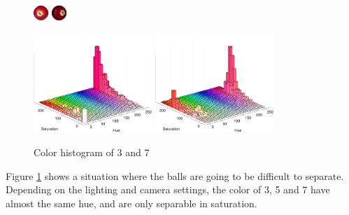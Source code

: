 \begin{figure}[H]
\centering
\subfloat
{
	\includegraphics[width=0.05\textwidth]{images/balls/3.png}
}
\hspace{0.4\textwidth}
\subfloat
{
	\includegraphics[width=0.05\textwidth]{images/balls/7.png}
}

\subfloat
{
	\includegraphics[width=0.4\textwidth]{images/ballhist/3}
}
\subfloat
{
	\includegraphics[width=0.4\textwidth]{images/ballhist/7}
}
\caption{Color histogram of 3 and 7}
\label{fig:ballhist-3-7}
\end{figure} 
Figure \ref{fig:ballhist-3-7} shows a situation where the balls are going to be difficult to separate. Depending on the lighting and camera settings, the color of 3, 5 and 7 have almost the same hue, and are only separable in saturation.

